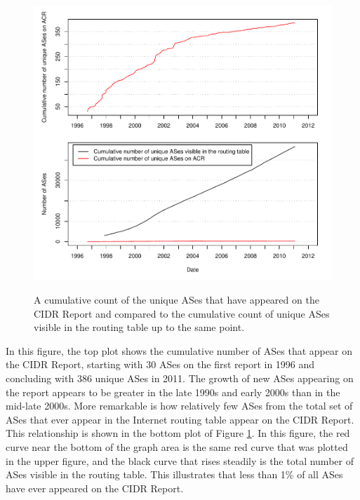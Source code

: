 \begin{figure}[h!]
\begin{centering}
\begin{singlespace}
    \includegraphics[width=6in]{figures/cumulative_asn_counts.pdf}
    \vspace{-2em}\\
    \caption[A cumulative count of the unique ASes that have appeared on the
        CIDR Report]{A cumulative count of the unique ASes that have appeared
        on the CIDR Report and compared to the cumulative count of unique ASes
        visible in the routing table up to the same point.}
    \label{fig:as_counts}
\end{singlespace}
\end{centering}
\end{figure}

In this figure, the top plot shows the cumulative number of ASes that appear on
the CIDR Report, starting with 30 ASes on the first report in 1996 and
concluding with 386 unique ASes in 2011. The growth of new ASes appearing on
the report appears to be greater in the late 1990s and early 2000s than in the
mid-late 2000s. More remarkable is how relatively few ASes from the total set
of ASes that ever appear in the Internet routing table appear on the CIDR
Report. This relationship is shown in the bottom plot of Figure
\ref{fig:as_counts}. In this figure, the red curve near the bottom of the graph
area is the same red curve that was plotted in the upper figure, and the black
curve that rises steadily is the total number of ASes visible in the routing
table. This illustrates that less than 1\% of all ASes have ever appeared on
the CIDR Report.

